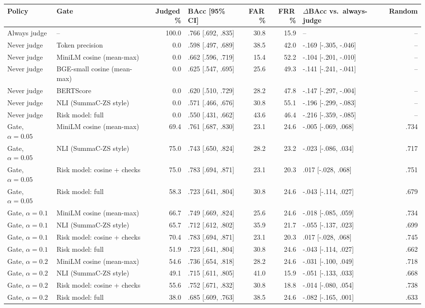 \begin{tabular}{llrlrrlr}
\toprule
Policy & Gate & Judged\,\% & BAcc [95\% CI] & FAR\,\% & FRR\,\% & $\Delta$BAcc vs.\ always-judge & Random \\
\midrule
Always judge & -- & 100.0 & .766 [.692, .835] & 30.8 & 15.9 & -- & -- \\
\midrule
Never judge & Token precision & 0.0 & .598 [.497, .689] & 38.5 & 42.0 & -.169 [-.305, -.046] & -- \\
Never judge & MiniLM cosine (mean-max) & 0.0 & .662 [.596, .719] & 15.4 & 52.2 & -.104 [-.201, -.010] & -- \\
Never judge & BGE-small cosine (mean-max) & 0.0 & .625 [.547, .695] & 25.6 & 49.3 & -.141 [-.241, -.041] & -- \\
Never judge & BERTScore & 0.0 & .620 [.510, .729] & 28.2 & 47.8 & -.147 [-.297, -.004] & -- \\
Never judge & NLI (SummaC-ZS style) & 0.0 & .571 [.466, .676] & 30.8 & 55.1 & -.196 [-.299, -.083] & -- \\
Never judge & Risk model: full & 0.0 & .550 [.431, .662] & 43.6 & 46.4 & -.216 [-.359, -.085] & -- \\
\midrule
Gate, $\alpha=0.05$ & MiniLM cosine (mean-max) & 69.4 & .761 [.687, .830] & 23.1 & 24.6 & -.005 [-.069, .068] & .734 \\
Gate, $\alpha=0.05$ & NLI (SummaC-ZS style) & 75.0 & .743 [.650, .824] & 28.2 & 23.2 & -.023 [-.086, .034] & .717 \\
Gate, $\alpha=0.05$ & Risk model: cosine + checks & 75.0 & .783 [.694, .871] & 23.1 & 20.3 & .017 [-.028, .068] & .751 \\
Gate, $\alpha=0.05$ & Risk model: full & 58.3 & .723 [.641, .804] & 30.8 & 24.6 & -.043 [-.114, .027] & .679 \\
\midrule
Gate, $\alpha=0.1$ & MiniLM cosine (mean-max) & 66.7 & .749 [.669, .824] & 25.6 & 24.6 & -.018 [-.085, .059] & .734 \\
Gate, $\alpha=0.1$ & NLI (SummaC-ZS style) & 65.7 & .712 [.612, .802] & 35.9 & 21.7 & -.055 [-.137, .023] & .699 \\
Gate, $\alpha=0.1$ & Risk model: cosine + checks & 70.4 & .783 [.694, .871] & 23.1 & 20.3 & .017 [-.028, .068] & .745 \\
Gate, $\alpha=0.1$ & Risk model: full & 51.9 & .723 [.641, .804] & 30.8 & 24.6 & -.043 [-.114, .027] & .662 \\
\midrule
Gate, $\alpha=0.2$ & MiniLM cosine (mean-max) & 54.6 & .736 [.654, .818] & 28.2 & 24.6 & -.031 [-.100, .049] & .718 \\
Gate, $\alpha=0.2$ & NLI (SummaC-ZS style) & 49.1 & .715 [.611, .805] & 41.0 & 15.9 & -.051 [-.133, .033] & .668 \\
Gate, $\alpha=0.2$ & Risk model: cosine + checks & 55.6 & .752 [.671, .832] & 30.8 & 18.8 & -.014 [-.080, .054] & .738 \\
Gate, $\alpha=0.2$ & Risk model: full & 38.0 & .685 [.609, .763] & 38.5 & 24.6 & -.082 [-.165, .001] & .633 \\
\bottomrule
\end{tabular}
